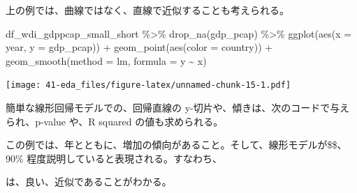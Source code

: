 \documentclass[
]{bxjsbook}
\newenvironment{Shaded}{\begin{snugshade}}{\end{snugshade}}
\newcommand{\AttributeTok}[1]{\textcolor[rgb]{0.77,0.63,0.00}{#1}}
\newcommand{\FunctionTok}[1]{\textcolor[rgb]{0.00,0.00,0.00}{#1}}
\newcommand{\NormalTok}[1]{#1}
\newcommand{\SpecialCharTok}[1]{\textcolor[rgb]{0.00,0.00,0.00}{#1}}
\newcommand{\StringTok}[1]{\textcolor[rgb]{0.31,0.60,0.02}{#1}}
\theoremstyle{definition}
\theoremstyle{definition}
\theoremstyle{definition}
\theoremstyle{definition}
\theoremstyle{remark}
\begin{document}
上の例では、曲線ではなく、直線で近似することも考えられる。

\begin{Shaded}
\begin{Highlighting}[]
\NormalTok{df\_wdi\_gdppcap\_small\_short }\SpecialCharTok{\%\textgreater{}\%} \FunctionTok{drop\_na}\NormalTok{(gdp\_pcap) }\SpecialCharTok{\%\textgreater{}\%}
  \FunctionTok{ggplot}\NormalTok{(}\FunctionTok{aes}\NormalTok{(}\AttributeTok{x =}\NormalTok{ year, }\AttributeTok{y =}\NormalTok{ gdp\_pcap)) }\SpecialCharTok{+} 
  \FunctionTok{geom\_point}\NormalTok{(}\FunctionTok{aes}\NormalTok{(}\AttributeTok{color =}\NormalTok{ country)) }\SpecialCharTok{+} 
  \FunctionTok{geom\_smooth}\NormalTok{(}\AttributeTok{method =} \StringTok{\textquotesingle{}lm\textquotesingle{}}\NormalTok{, }\AttributeTok{formula =} \StringTok{\textquotesingle{}y \textasciitilde{} x\textquotesingle{}}\NormalTok{)}
\end{Highlighting}
\end{Shaded}

\texttt{[image: 41-eda\_files/figure-latex/unnamed-chunk-15-1.pdf]}

簡単な線形回帰モデルでの、回帰直線の y-切片や、傾きは、次のコードで与えられ、p-value や、R squared の値も求められる。

この例では、年とともに、増加の傾向があること。そして、線形モデルが\$\$、90\% 程度説明していると表現される。すなわち、

は、良い、近似であることがわかる。
\end{document}
